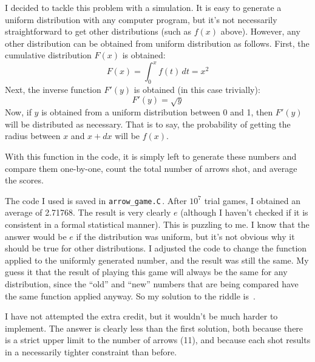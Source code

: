 \documentclass{article}
\begin{document}
I decided to tackle this problem with a simulation.
It is easy to generate a uniform distribution with any computer program, but it's not necessarily straightforward to get other distributions (such as $f(x)$ above).
However, any other distribution can be obtained from uniform distribution as follows.
First, the cumulative distribution $F(x)$ is obtained:
\[
F(x)=\int_{0}^{x}f(t)\,dt=x^{2}
\]
Next, the inverse function $F'(y)$ is obtained (in this case trivially):
\[
F'(y)=\sqrt{y}
\]
Now, if $y$ is obtained from a uniform distribution between 0 and 1, then $F'(y)$ will be distributed as necessary.
That is to say, the probability of getting the radius between $x$ and $x+dx$ will be $f(x)$.

With this function in the code, it is simply left to generate these numbers and compare them one-by-one, count the total number of arrows shot, and average the scores.

The code I used is saved in \texttt{arrow\_game.C}\,.
After $10^{7}$ trial games, I obtained an average of 2.71768.
The result is very clearly $e$ (although I haven't checked if it is consistent in a formal statistical manner).
This is puzzling to me.
I know that the answer would be $e$ if the distribution was uniform, but it's not obvious why it should be true for other distributions.
I adjusted the code to change the function applied to the uniformly generated number, and the result was still the same.
My guess it that the result of playing this game will always be the same for any distribution, since the ``old'' and ``new'' numbers that are being compared have the same function applied anyway.
So my solution to the riddle is
\,.

I have not attempted the extra credit, but it wouldn't be much harder to implement.
The answer is clearly less than the first solution, both because there is a strict upper limit to the number of arrows (11), and because each shot results in a necessarily tighter constraint than before.
\end{document}
